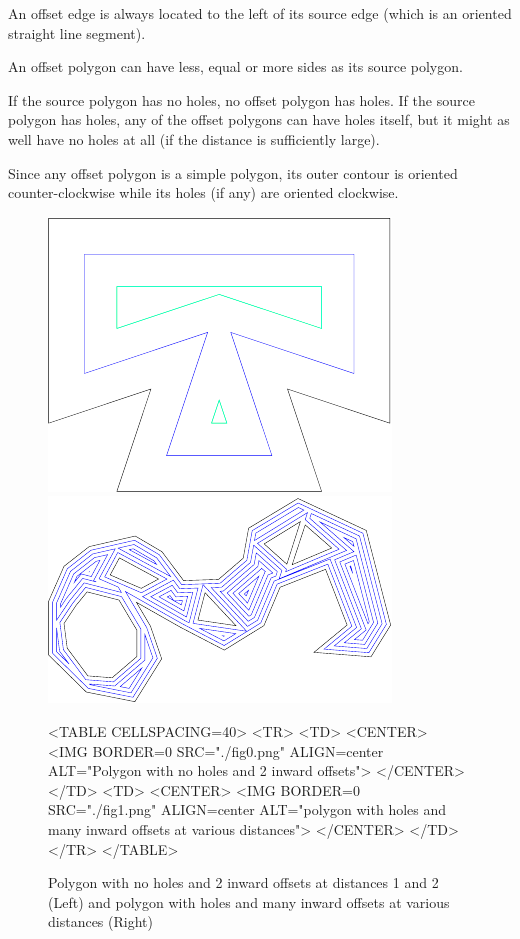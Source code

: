 An offset edge is always located to the left of its source edge (which
is an oriented straight line segment).

An offset polygon can have less, equal or more sides as its source
polygon.

If the source polygon has no holes, no offset polygon has holes. If
the source polygon has holes, any of the offset polygons can have
holes itself, but it might as well have no holes at all (if the
distance is sufficiently large).

Since any offset polygon is a simple polygon, its outer contour is
oriented counter-clockwise while its holes (if any) are oriented
clockwise.

\begin{figure}[htbp]
\begin{ccTexOnly}
\begin{center}
\includegraphics{Straight_skeleton_2/fig0} %
\includegraphics{Straight_skeleton_2/fig1} %
\end{center}
\end{ccTexOnly}
\begin{ccHtmlOnly}
<TABLE CELLSPACING=40>
<TR>
<TD>
<CENTER>
<IMG BORDER=0 SRC="./fig0.png" ALIGN=center ALT="Polygon with no holes and 2 inward offsets">
</CENTER>
</TD>
<TD>
<CENTER>
<IMG BORDER=0 SRC="./fig1.png" ALIGN=center ALT="polygon with holes and many inward offsets at various distances">
</CENTER>
</TD>
</TR>
</TABLE>
\end{ccHtmlOnly}
\caption{Polygon with no holes and 2 inward offsets at distances 1 and 2 (Left) 
         and polygon with holes and many inward offsets at various distances (Right)
\label{Simplepoly-offsets}}
\end{figure}

